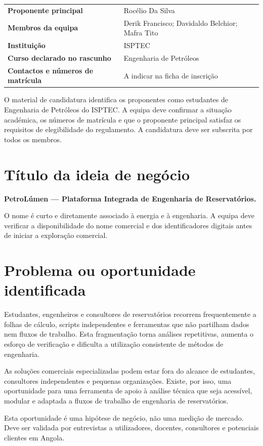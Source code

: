 \documentclass[11pt,a4paper]{article}
\begin{document}
\begin{tabularx}{\textwidth}{>{\bfseries}p{4.1cm} X}
  Proponente principal & Rocélio Da Silva \\
  Membros da equipa & Derik Francisco; Davidaldo Belchior; Mafra Tito \\
  Instituição & ISPTEC \\
  Curso declarado no rascunho & Engenharia de Petróleos \\
  Contactos e números de matrícula & A indicar na ficha de inscrição \\
\end{tabularx}

O material de candidatura identifica os proponentes como estudantes de Engenharia de
Petróleos do ISPTEC. A equipa deve confirmar a situação académica, os números de
matrícula e que o proponente principal satisfaz os requisitos de elegibilidade do
regulamento. A candidatura deve ser subscrita por todos os membros.

\section{Título da ideia de negócio}

\textbf{PetroLúmen — Plataforma Integrada de Engenharia de Reservatórios.}

O nome é curto e diretamente associado à energia e à engenharia. A equipa deve
verificar a disponibilidade do nome comercial e dos identificadores digitais antes
de iniciar a exploração comercial.

\section{Problema ou oportunidade identificada}

Estudantes, engenheiros e consultores de reservatórios recorrem frequentemente a
folhas de cálculo, scripts independentes e ferramentas que não partilham dados nem
fluxos de trabalho. Esta fragmentação torna análises repetitivas, aumenta o esforço
de verificação e dificulta a utilização consistente de métodos de engenharia.

As soluções comerciais especializadas podem estar fora do alcance de estudantes,
consultores independentes e pequenas organizações. Existe, por isso, uma oportunidade
para uma ferramenta de apoio à análise técnica que seja acessível, modular e adaptada
a fluxos de trabalho de engenharia de reservatórios.

Esta oportunidade é uma hipótese de negócio, não uma medição de mercado. Deve ser
validada por entrevistas a utilizadores, docentes, consultores e potenciais clientes
em Angola.
\end{document}

